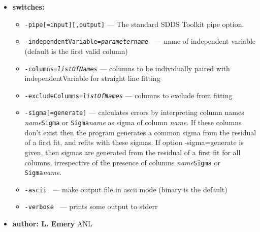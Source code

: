 \begin{itemize}
\item {\bf switches:}
%
%
    \begin{itemize}
%
%
    \item {\tt  -pipe[=input][,output]} --- The standard SDDS Toolkit pipe option.
    \item {\tt  -independentVariable={\em parametername} }
        --- name of independent variable (default is the first valid column)
    \item {\tt  -columns={\em listOfNames}}   
        ---  columns to be individually paired with independentVariable for straight line fitting
    \item {\tt  -excludeColumns={\em listOfNames}}  ---    columns to exclude from fitting
    \item {\tt  -sigma[=generate]}  
        ---   calculates errors by interpreting column names 
        {\em name}\verb|Sigma| or \verb|Sigma|{\em name} as
        sigma of column {\em name}. If these columns don't exist
        then the program generates a common sigma from the residual of a first fit,
        and refits with these sigmas. If option -sigma=generate is given,
        then sigmas are generated from the residual of a first fit for all columns,
        irrespective of the presence of columns {\em name}\verb|Sigma| or \verb|Sigma|{\em name}.
    \item {\tt  -ascii }    ---         make output file in ascii mode (binary is the default)
    \item {\tt  -verbose }  ---         prints some output to stderr

    \end{itemize}
%
%
%
%
\item {\bf author: L. Emery } ANL
\end{itemize}

